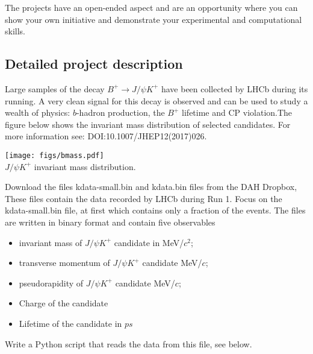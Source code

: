 The projects have an open-ended aspect and are an opportunity where you can show your own initiative and demonstrate your experimental and computational skills.




\subsection{Detailed project description}
%
Large samples of the decay $B^+ \rightarrow J/\psi K^+$ have been collected by LHCb during its running. A very clean signal for this decay is observed and can be used to study a wealth of physics: $b$-hadron production, the $B^+$ lifetime and CP violation.The figure below shows the invariant mass distribution of selected candidates.
For more information see: {DOI:10.1007/JHEP12(2017)026}. 
%
\begin{center}
\texttt{[image: figs/bmass.pdf]}\\
{\small $J/\psi K^+$ invariant mass distribution.}
\end{center}
%

Download the files kdata-small.bin and kdata.bin files  from the DAH Dropbox, 
These files contain the data recorded by LHCb during Run 1. Focus on the kdata-small.bin file,  at first which contains only a fraction of the events. 
The files are written in binary format and contain five observables
\begin{itemize}
\item  invariant mass of $J/\psi K^+$  candidate  in  MeV/$c^2$;
\item transverse momentum of  $J/\psi K^+$   candidate  MeV/$c$;
\item pseudorapidity of  $J/\psi K^+$   candidate  MeV/$c$;
\item Charge of the  candidate
\item Lifetime of the candidate in $ps$
\end{itemize}

Write a Python script that reads the data from this file, see below. 


